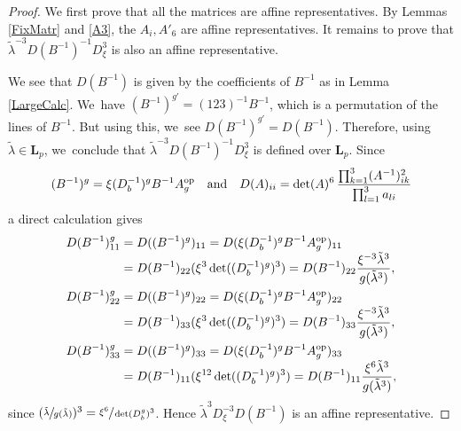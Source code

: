\documentclass[JEP,XML,SOM,Unicode,NoFloatCountersInSection, NoEqCountersInSection,published]{cedram}
\newcommand{\op}{\textup{op}}
\newcommand{\quand}{\quad\text{and}\quad}
\theoremstyle{definition}
\newcommand{\LL}{{\boldsymbol{L}}}
\begin{document}
\begin{proof}
We first prove that all the matrices are affine representatives. By Lemmas \ref{FixMatr} and \ref{A3}, the $A_i, A'_6$ are affine representatives. It remains to prove that $ \tilde \lambda^{-3} D(B^{-1})^{-1}D_{\xi}^3$ is also an affine representative.

We see that $D(B^{-1})$ is given by the coefficients of $B^{-1}$ as in Lemma \ref{LargeCalc}. We~have $(B^{-1})^{g'} = (123)^{-1}B^{-1}$, which is a permutation of the lines of $B^{-1}$. But using this, we~see $D(B^{-1})^{g'} = D(B^{-1})$. Therefore, using $\tilde \lambda \in \LL_p$, we~conclude that $ \tilde \lambda^{-3} D(B^{-1})^{-1}D_{\xi}^3$ is defined over $\LL_p$. Since\vspace*{-3pt}
\[
(B^{-1})^g = \xi (D_b^{-1})^g B^{-1}A_g^{\op}
\quand
D(A)_{ii} = \det(A)^6\,\frac{\prod_{k=1}^3(A^{-1})_{ik}^2}{\prod_{l=1}^3a_{li}}
\]
a direct calculation gives
\begin{align*}
D(B^{-1})^g_{11} &= D((B^{-1})^g)_{11} = D(\xi (D_b^{-1})^g B^{-1}A_g^{\op})_{11}
\\[-3pt]
&= D(B^{-1})_{22} (\xi^3 \det((D_b^{-1})^g)^3) = D(B^{-1})_{22} \frac{\xi^{-3} \tilde \lambda^3}{g(\tilde \lambda ^3)},
\\
D(B^{-1})^g_{22} &= D((B^{-1})^g)_{22} = D(\xi (D_b^{-1})^g B^{-1}A_g^{\op})_{22}
\\[-3pt]
&= D(B^{-1})_{33} (\xi^3 \det((D_b^{-1})^g)^3) =D(B^{-1})_{33} \frac{\xi^{-3} \tilde \lambda^3}{g(\tilde \lambda ^3)},
\\
D(B^{-1})^g_{33} &= D((B^{-1})^g)_{33} = D(\xi (D_b^{-1})^g B^{-1}A_g^{\op})_{33}
\\[-3pt]
&= D(B^{-1})_{11} (\xi^{12} \det((D_b^{-1})^g)^3) = D(B^{-1})_{11} \frac{\xi^{6} \tilde \lambda^3}{g(\tilde \lambda ^3)},
\end{align*}
since $(\sfrac{\tilde \lambda}{g(\tilde \lambda)})^3 = \sfrac{\xi^6}{\det(D_b^g)^3}$. Hence $\tilde \lambda^{3} D_{\xi}^{-3} D(B^{-1})$ is an affine representative.


\end{proof}
\end{document}
